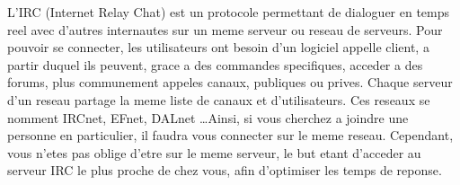 L'IRC (Internet Relay Chat) est un protocole permettant de dialoguer en temps reel avec d'autres internautes sur un meme serveur ou reseau de serveurs. Pour pouvoir se connecter, les utilisateurs ont besoin d'un logiciel appelle client, a partir duquel ils peuvent, grace a des commandes specifiques, acceder a des forums, plus communement appeles canaux, publiques ou prives. Chaque serveur d'un reseau partage la meme liste de canaux et d'utilisateurs. Ces reseaux se nomment IRCnet, EFnet, DALnet \ldots Ainsi, si vous cherchez a joindre une personne en particulier, il faudra vous connecter sur le meme reseau. Cependant, vous n'etes pas oblige d'etre sur le meme serveur, le but etant d'acceder au serveur IRC le plus proche de chez vous, afin d'optimiser les temps de reponse.          
